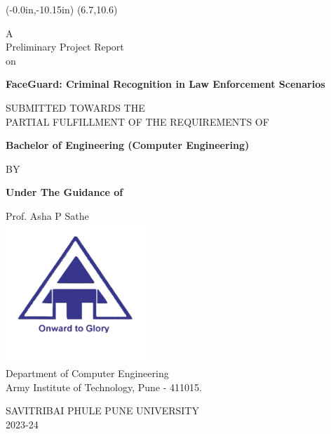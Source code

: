 \thisfancyput(-0.0in,-10.15in){
	\setlength{\unitlength}{1in}
	\framebox(6.7,10.6)
}
\setlength{\parindent}{0mm}
\begin{center}
	A \\ Preliminary Project Report \\ on

	\vspace*{1\baselineskip}

	{
		\bfseries \Large
		FaceGuard: Criminal Recognition in Law Enforcement Scenarios
		\vspace*{1.5\baselineskip}
	}

	SUBMITTED TOWARDS THE \\
	PARTIAL FULFILLMENT OF THE REQUIREMENTS OF \\
	
	\vspace*{1.5\baselineskip}

	{
		\bfseries \large
		Bachelor of Engineering (Computer Engineering) \\
		\vspace*{1\baselineskip}

		BY \\
		\vspace*{1\baselineskip}
	}

	\nametable

	\vspace*{0.5\baselineskip}

	{
		\bfseries \large
		Under The Guidance of \\  
		\vspace*{0.5\baselineskip}
	}

	Prof. Asha P Sathe\\[1cm]

	\includegraphics[scale=0.75]{components/images/logo.png} \\[0.5cm]
	
	Department of Computer Engineering \\
	Army Institute of Technology, Pune - 411015.\\
	\vspace*{0.5\baselineskip}

	SAVITRIBAI PHULE PUNE UNIVERSITY \\
	2023-24
\end{center}

\pagebreak
